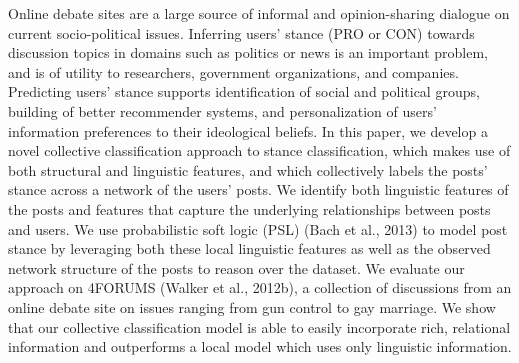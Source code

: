Online debate sites are a large source of informal and opinion-sharing dialogue on current socio-political issues. Inferring users' stance (PRO or CON) towards discussion topics in domains such as politics or news is an important problem, and is of utility to researchers, government organizations, and companies. Predicting users' stance supports identification of social and political groups, building of better recommender systems, and personalization of users' information preferences to their ideological beliefs. In this paper, we develop a novel collective classification approach to stance classification, which makes use of both structural and linguistic features, and which collectively labels the posts' stance across a network of the users' posts. We identify both linguistic features of the posts and features that capture the underlying relationships between posts and users. We use probabilistic soft logic (PSL) (Bach et al., 2013) to model post stance by leveraging both these local linguistic features as well as the observed network structure of the posts to reason over the dataset. We evaluate our approach on 4FORUMS (Walker et al., 2012b), a collection of discussions from an online debate site on issues ranging from gun control to gay marriage. We show that our collective classification model is able to easily incorporate rich, relational information and outperforms a local model which uses only linguistic information.
